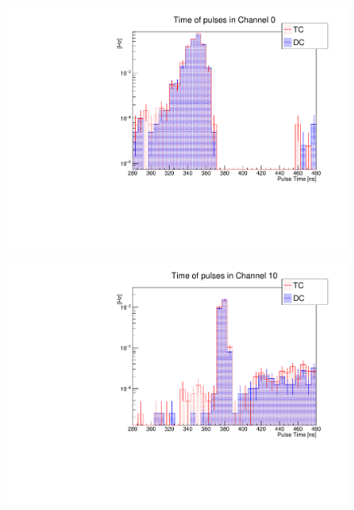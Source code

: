\documentclass[12pt]{article}
\begin{document}
\begin{figure}[b!]
\centering
\begin{minipage}{.5\textwidth}
  \centering
  \includegraphics[width=1.\linewidth]{figures/triggerEfficiency/Comparison_Run2196_TC_CH0_Time_vs_Run2194_DC_CH0_Time}
  \label{fig:Ch0Time}
\end{minipage}%
\begin{minipage}{.5\textwidth}
  \centering
  \includegraphics[width=1.\linewidth]{figures/triggerEfficiency/Comparison_Run2196_TC_CH10_Time_vs_Run2194_DC_CH10_Time}
  \label{fig:Ch10Time}
\end{minipage}
\end{figure}
\end{document}
